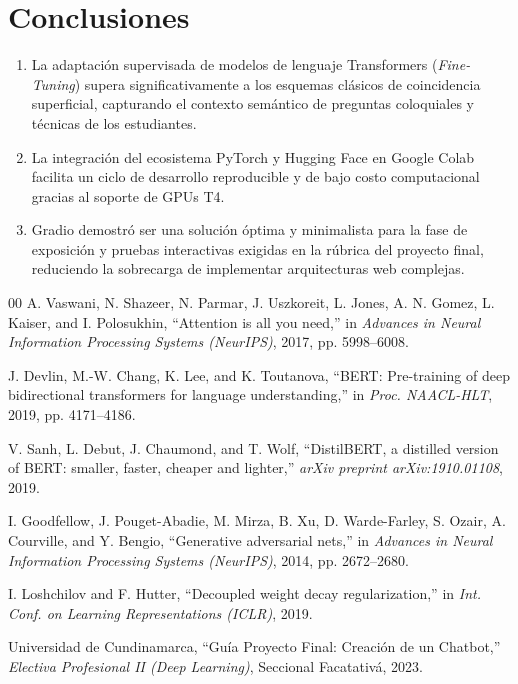 \documentclass[conference]{IEEEtran}
\begin{document}
\section{Conclusiones}
\begin{enumerate}
    \item La adaptación supervisada de modelos de lenguaje Transformers (\textit{Fine-Tuning}) supera significativamente a los esquemas clásicos de coincidencia superficial, capturando el contexto semántico de preguntas coloquiales y técnicas de los estudiantes.
    \item La integración del ecosistema PyTorch y Hugging Face en Google Colab facilita un ciclo de desarrollo reproducible y de bajo costo computacional gracias al soporte de GPUs T4.
    \item Gradio demostró ser una solución óptima y minimalista para la fase de exposición y pruebas interactivas exigidas en la rúbrica del proyecto final, reduciendo la sobrecarga de implementar arquitecturas web complejas.
\end{enumerate}

\begin{thebibliography}{00}
 A. Vaswani, N. Shazeer, N. Parmar, J. Uszkoreit, L. Jones, A. N. Gomez, L. Kaiser, and I. Polosukhin, ``Attention is all you need,'' in \textit{Advances in Neural Information Processing Systems (NeurIPS)}, 2017, pp. 5998--6008.

 J. Devlin, M.-W. Chang, K. Lee, and K. Toutanova, ``BERT: Pre-training of deep bidirectional transformers for language understanding,'' in \textit{Proc. NAACL-HLT}, 2019, pp. 4171--4186.

 V. Sanh, L. Debut, J. Chaumond, and T. Wolf, ``DistilBERT, a distilled version of BERT: smaller, faster, cheaper and lighter,'' \textit{arXiv preprint arXiv:1910.01108}, 2019.

 I. Goodfellow, J. Pouget-Abadie, M. Mirza, B. Xu, D. Warde-Farley, S. Ozair, A. Courville, and Y. Bengio, ``Generative adversarial nets,'' in \textit{Advances in Neural Information Processing Systems (NeurIPS)}, 2014, pp. 2672--2680.

 I. Loshchilov and F. Hutter, ``Decoupled weight decay regularization,'' in \textit{Int. Conf. on Learning Representations (ICLR)}, 2019.

 Universidad de Cundinamarca, ``Guía Proyecto Final: Creación de un Chatbot,'' \textit{Electiva Profesional II (Deep Learning)}, Seccional Facatativá, 2023.
\end{thebibliography}
\end{document}
